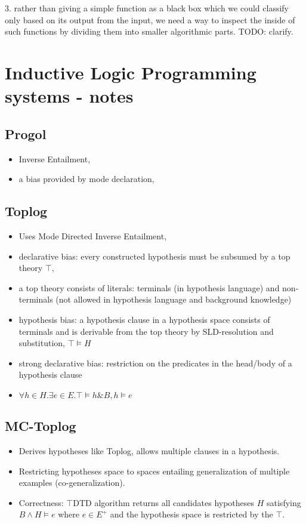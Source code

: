 3. rather than giving a simple function as a black box which we could classify only based on its output from the input, we need a way to inspect the inside of such functions by dividing them into smaller algorithmic parts.
TODO: clarify.

\section{Inductive Logic Programming systems - notes}

\subsection{Progol}
\begin{itemize}
\item Inverse Entailment,
\item a bias provided by mode declaration,

\end{itemize}

\subsection{Toplog}
\begin{itemize}
\item Uses Mode Directed Inverse Entailment,
\item declarative bias: every constructed hypothesis must be subsumed by a top theory $\top$,
\item a top theory consists of literals: terminals (in hypothesis language) and non-terminals (not allowed in hypothesis language and background knowledge)
\item hypothesis bias: a hypothesis clause in a hypothesis space consists of terminals and is derivable from the top theory by SLD-resolution and substitution, $\top \models H$
\item strong declarative bias: restriction on the predicates in the head/body of a hypothesis clause
\item $\forall h \in H. \exists e \in E. \top \models h \& B, h \models e$
\end{itemize}

\subsection{MC-Toplog}
\begin{itemize}
\item Derives hypotheses like Toplog, allows multiple clauses in a hypothesis.
\item Restricting hypotheses space to spaces entailing generalization of multiple examples (co-generalization).
\item Correctness: $\top$DTD algorithm returns all candidates hypotheses $H$ satisfying $B \wedge H \models e$ where $e \in E^+$ and the hypothesis space is restricted by the $\top$.
\end{itemize}

